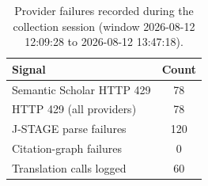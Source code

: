 \begin{table}[h]
\centering\small
\caption{Provider failures recorded during the collection session (window 2026-08-12 12:09:28 to 2026-08-12 13:47:18).}
\label{tab:supp-failures}
\begin{tabular}{lc}
\toprule
Signal & Count \\
\midrule
Semantic Scholar HTTP 429 & 78 \\
HTTP 429 (all providers) & 78 \\
J-STAGE parse failures & 120 \\
Citation-graph failures & 0 \\
Translation calls logged & 60 \\
\bottomrule
\end{tabular}
\end{table}

